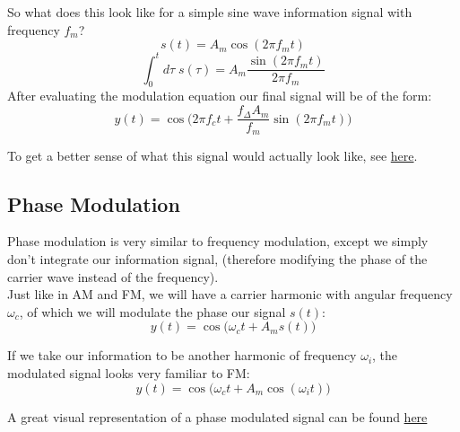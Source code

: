 \documentclass[a4paper]{article}
\numberwithin{equation}{section}
\begin{document}
So what does this look like for a simple sine wave information signal with frequency $f_m$? 
\begin{equation}
s(t) = A_m \cos{(2\pi f_m t)}
\end{equation}
\begin{equation}
\int_{0}^{t}d\tau \; s(\tau) = A_m \frac{\sin{(2\pi f_m t)}}{2\pi f_m}
\end{equation}
After evaluating the modulation equation our final signal will be of the form:
\begin{equation}
y(t)=\cos{\big(2\pi f_c t+\frac{f_\Delta A_m}{f_m} \sin{(2\pi f_m t)}\big)}
\end{equation}

To get a better sense of what this signal would actually look like, see \href{https://www.desmos.com/calculator/oapme28nfh}{here}.

\subsection{Phase Modulation}
Phase modulation is very similar to frequency modulation, except we simply don't integrate our information signal, (therefore modifying the phase of the carrier wave instead of the frequency).\\

Just like in AM and FM, we will have a carrier harmonic with angular frequency $\omega_c$, of which we will modulate the phase our signal $s(t)$:
\begin{equation}
y(t)=\cos{\big(\omega_ct+A_m s(t) \big)}
\end{equation}

If we take our information to be another harmonic of frequency $\omega_i$, the modulated signal looks very familiar to FM:
\begin{equation}
y(t)=\cos{\big(\omega_ct+A_m \cos{(\omega_i t)} \big)}
\end{equation}

A great visual representation of a phase modulated signal can be found \href{https://upload.wikimedia.org/wikipedia/commons/a/ae/Phase-modulation.gif}{here}
\end{document}
